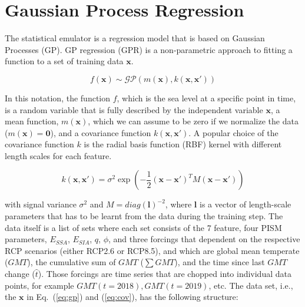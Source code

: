 \documentclass[12pt,a4paper]{article}
\begin{document}
\section{Gaussian Process Regression}

The statistical emulator is a regression model that is based on Gaussian Processes (GP).
GP regression (GPR) is a non-parametric approach to fitting a function to a set of training data $\mathbf{x}$.

\begin{equation}
f(\mathbf{x}) \sim \mathcal{GP} \left(m(\mathbf{x}), k(\mathbf{x},\mathbf{x'}) \right)
\label{eq:gp}
\end{equation}

In this notation, the function $f$, which is the sea level at a specific point in time, is a random variable that is fully described by the independent variable $\mathbf{x}$, a mean function, $m(\mathbf{x})$, which we can assume to be zero if we normalize the data ($m(\mathbf{x})=\textbf{0}$), and a covariance function $k(\mathbf{x},\mathbf{x'})$.
A popular choice of the covariance function $k$ is the radial basis function (RBF) kernel with different length scales for each feature.

\begin{equation}
k(\mathbf{x}, \mathbf{x}') = \sigma^2 \exp\left(-\frac{1}{2}(\mathbf{x}-\mathbf{x'})^T M (\mathbf{x}-\mathbf{x'})\right)
\label{eq:cov}
\end{equation}

with signal variance $\sigma^2$ and $M=diag(\mathbf{l})^{-2}$, where $\mathbf{l}$ is a vector of length-scale parameters that has to be learnt from the data during the training step.
The data itself is a list of sets where each set consists of the 7 feature, four PISM parameters, $E_{SSA}$, $E_{SIA}$, $q$, $\phi$, and three forcings that dependent on the respective RCP scenarios (either RCP2.6 or RCP8.5), and which are global mean temperate ($GMT$), the cumulative sum of $GMT$ ($\sum GMT$), and the time since last $GMT$ change ($\hat{t}$).
Those forcings are time series that are chopped into individual data points, for example $GMT(t=2018), GMT(t=2019)$, etc.
The data set, i.e., the $\mathbf{x}$ in Eq.~(\ref{eq:gp}) and (\ref{eq:cov}), has the following structure:
\end{document}
